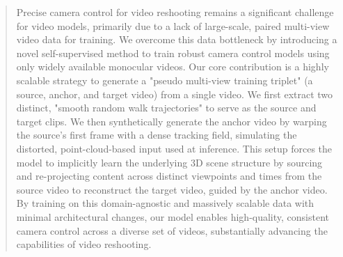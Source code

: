 \begin{abstract}
Precise camera control for video reshooting remains a significant challenge for video models, primarily due to a lack of large-scale, paired multi-view video data for training. We overcome this data bottleneck by introducing a novel self-supervised method to train robust camera control models using only widely available monocular videos. Our core contribution is a highly scalable strategy to generate a "pseudo multi-view training triplet" (a source, anchor, and target video) from a single video. We first extract two distinct, "smooth random walk trajectories" to serve as the source and target clips. We then synthetically generate the anchor video by warping the source's first frame with a dense tracking field, simulating the distorted, point-cloud-based input used at inference. This setup forces the model to implicitly learn the underlying 3D scene structure by sourcing and re-projecting content across distinct viewpoints and times from the source video to reconstruct the target video, guided by the anchor video. By training on this domain-agnostic and massively scalable data with minimal architectural changes, our model enables high-quality, consistent camera control across a diverse set of videos, substantially advancing the capabilities of video reshooting.
\end{abstract}